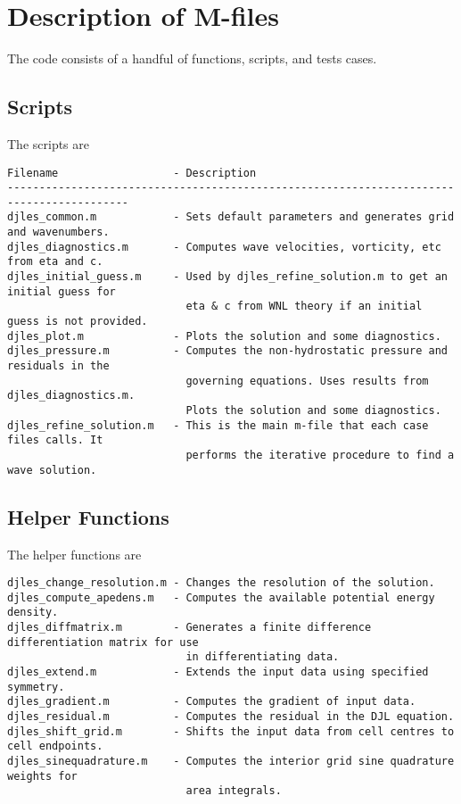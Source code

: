 \documentclass[letterpaper]{article}
\begin{document}
\section{Description of M-files}
The code consists of a handful of functions, scripts, and tests cases.

\subsection{Scripts}
The scripts are
\begin{verbatim}
Filename                  - Description
-----------------------------------------------------------------------------------------
djles_common.m            - Sets default parameters and generates grid and wavenumbers.
djles_diagnostics.m       - Computes wave velocities, vorticity, etc from eta and c.
djles_initial_guess.m     - Used by djles_refine_solution.m to get an initial guess for
                            eta & c from WNL theory if an initial guess is not provided.
djles_plot.m              - Plots the solution and some diagnostics.
djles_pressure.m          - Computes the non-hydrostatic pressure and residuals in the
                            governing equations. Uses results from djles_diagnostics.m.
                            Plots the solution and some diagnostics.
djles_refine_solution.m   - This is the main m-file that each case files calls. It
                            performs the iterative procedure to find a wave solution.
\end{verbatim}

\subsection{Helper Functions}
The helper functions are
\begin{verbatim}
djles_change_resolution.m - Changes the resolution of the solution.
djles_compute_apedens.m   - Computes the available potential energy density.
djles_diffmatrix.m        - Generates a finite difference differentiation matrix for use
                            in differentiating data.
djles_extend.m            - Extends the input data using specified symmetry.
djles_gradient.m          - Computes the gradient of input data.
djles_residual.m          - Computes the residual in the DJL equation.
djles_shift_grid.m        - Shifts the input data from cell centres to cell endpoints.
djles_sinequadrature.m    - Computes the interior grid sine quadrature weights for
                            area integrals.
\end{verbatim}
\end{document}
